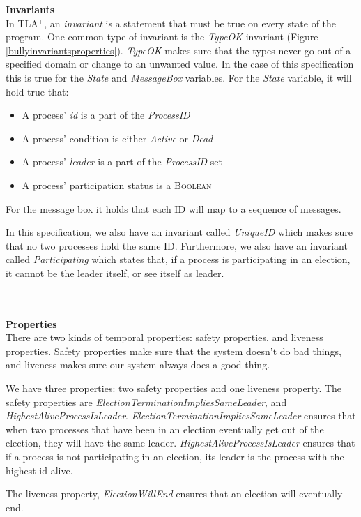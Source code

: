 \documentclass{report}
\begin{document}
\textbf{Invariants}\\
\noindent
In TLA$^{+}$, an \textit{invariant} is a statement that must be true on every state of the program. One common type of invariant is the \textit{TypeOK} invariant (Figure \ref{bullyinvariantsproperties}). \textit{TypeOK} makes sure that the types never go out of a specified domain or change to an unwanted value. In the case of this specification this is true for the \textit{State} and \textit{MessageBox} variables. For the \textit{State} variable, it will hold true that:
\begin{itemize}
  \item A process' \textit{id} is a part of the \textit{ProcessID}
  \item A process' condition is either \textit{Active} or \textit{Dead}
  \item A process' \textit{leader} is a part of the \textit{ProcessID} set
  \item A process' participation status is a \textsc{Boolean}
\end{itemize}
For the message box it holds that each ID will map to a sequence of messages.

In this specification, we also have an invariant called \textit{UniqueID} which makes sure that no two processes hold the same ID. Furthermore, we also have an invariant called \textit{Participating} which states that, if a process is participating in an election, it cannot be the leader itself, or see itself as leader.

\\\\
\noindent
\textbf{Properties}\\
\noindent
There are two kinds of temporal properties: safety properties, and liveness properties. Safety properties make sure that the system doesn't do bad things, and liveness makes sure our system always does a good thing.

We have three properties: two safety properties and one liveness property. The safety properties are \textit{ElectionTerminationImpliesSameLeader}, and \textit{HighestAliveProcessIsLeader}. \textit{ElectionTerminationImpliesSameLeader} ensures that when two processes that have been in an election eventually get out of the election, they will have the same leader. \textit{HighestAliveProcessIsLeader} ensures that if a process is not participating in an election, its leader is the process with the highest id alive.

The liveness property, \textit{ElectionWillEnd} ensures that an election will eventually end.
\end{document}
